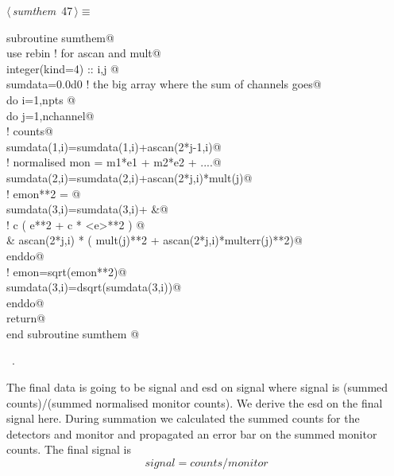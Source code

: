 \documentclass[10pt,a4paper,notitlepage]{article}
\begin{document}
\begin{flushleft} \small
\begin{minipage}{\linewidth}\label{scrap50}\raggedright\small
{} $\langle\,${\it sumthem}\nobreak\ {\footnotesize {47}}$\,\rangle\equiv$
\vspace{-1ex}
\begin{list}{}{} \item
\mbox{}\verb@      subroutine sumthem@\\
\mbox{}\verb@      use rebin ! for ascan and mult@\\
\mbox{}\verb@      integer(kind=4) :: i,j     @\\
\mbox{}\verb@      sumdata=0.0d0 ! the big array where the sum of channels goes@\\
\mbox{}\verb@      do i=1,npts @\\
\mbox{}\verb@       do j=1,nchannel@\\
\mbox{}\verb@! counts@\\
\mbox{}\verb@        sumdata(1,i)=sumdata(1,i)+ascan(2*j-1,i)@\\
\mbox{}\verb@! normalised mon      = m1*e1 + m2*e2 + ....@\\
\mbox{}\verb@        sumdata(2,i)=sumdata(2,i)+ascan(2*j,i)*mult(j)@\\
\mbox{}\verb@! emon**2  = @\\
\mbox{}\verb@        sumdata(3,i)=sumdata(3,i)+                                       &@\\
\mbox{}\verb@!             c         (     e**2     +         c   *  <e>**2     )   @\\
\mbox{}\verb@     &     ascan(2*j,i) * ( mult(j)**2 + ascan(2*j,i)*multerr(j)**2)@\\
\mbox{}\verb@       enddo@\\
\mbox{}\verb@! emon=sqrt(emon**2)@\\
\mbox{}\verb@       sumdata(3,i)=dsqrt(sumdata(3,i))@\\
\mbox{}\verb@      enddo@\\
\mbox{}\verb@      return@\\
\mbox{}\verb@      end subroutine sumthem                                                 @{\NWsep}
\end{list}
\vspace{-1.5ex}
\footnotesize
\begin{list}{}{\setlength{\itemsep}{-\parsep}\setlength{\itemindent}{-\leftmargin}}
\item \NWtxtMacroRefIn\ .

\item{}
\end{list}
\end{minipage}\vspace{4ex}
\end{flushleft}
The final data is going to be signal and esd on signal where signal is
(summed counts)/(summed normalised monitor counts).
We derive the esd on the final signal here.
During summation we calculated the summed counts for the detectors and monitor
and propagated an error bar on the summed monitor counts. 
The final signal is
\[ signal = counts / monitor \]
\end{document}
